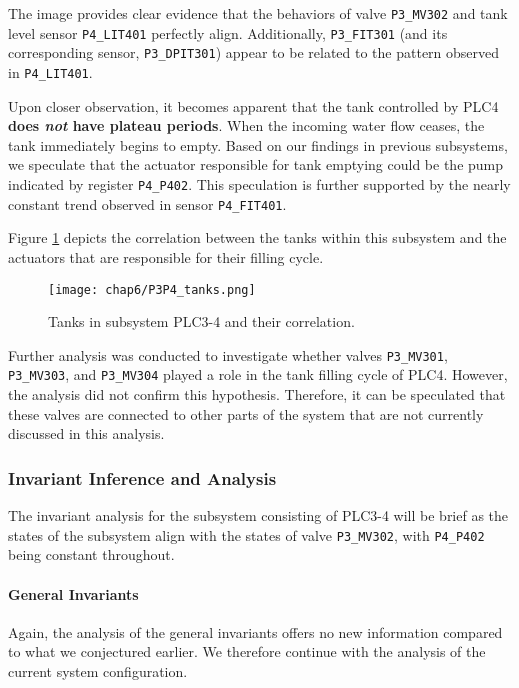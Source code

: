 The image provides clear evidence that the behaviors of valve \texttt{P3\_MV302} and tank level sensor \texttt{P4\_LIT401} perfectly align. Additionally, \texttt{P3\_FIT301} (and its corresponding sensor, \texttt{P3\_DPIT301}) appear to be related to the pattern observed in \texttt{P4\_LIT401}.
 
\bigskip
Upon closer observation, it becomes apparent that the tank controlled by PLC4 \textbf{does \textit{not} have plateau periods}. When the incoming water flow ceases, the tank immediately begins to empty. Based on our findings in previous subsystems, we speculate that the actuator responsible for tank emptying could be the pump indicated by register \texttt{P4\_P402}. This speculation is further supported by the nearly constant trend observed in sensor \texttt{P4\_FIT401}.

\bigskip
Figure \ref{fig:6_graph_P3P4_tanks} depicts the correlation between the tanks within this subsystem and the actuators that are responsible for their filling cycle.

\begin{figure}[ht]
	\centering
	\texttt{[image: chap6/P3P4\_tanks.png]}
	\caption{Tanks in subsystem PLC3-4 and their correlation.}
	\label{fig:6_graph_P3P4_tanks}
\end{figure}

\bigskip
Further analysis was conducted to investigate whether valves \texttt{P3\_MV301}, \texttt{P3\_MV303}, and \texttt{P3\_MV304} played a role in the tank filling cycle of PLC4. However, the analysis did not confirm this hypothesis. Therefore, it can be speculated that these valves are connected to other parts of the system that are not currently discussed in this analysis.

\subsubsection{Invariant Inference and Analysis}
\label{subsubsec:6_P3P4_invariants}
The invariant analysis for the subsystem consisting of PLC3-4 will be brief as the states of the subsystem align with the states of valve \texttt{P3\_MV302}, with \texttt{P4\_P402} being constant throughout.

\paragraph{General Invariants}
\label{par:6_P3P4_general_invariant}
Again, the analysis of the general invariants offers no new information compared to what we conjectured earlier. We therefore continue with the analysis of the current system configuration.

